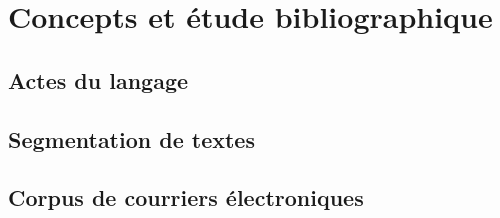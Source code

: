 
\chapter{Concepts et étude bibliographique}

\label{ch:background_and_related_work}

\section{Actes du langage}

\lipsum[1]

\section{Segmentation de textes}

\lipsum[1]

\section{Corpus de courriers électroniques}

\lipsum[1]